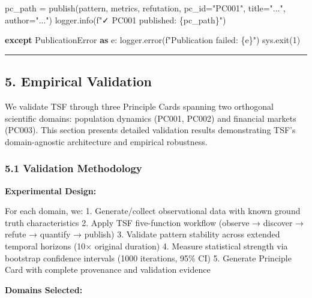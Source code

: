 \documentclass[
]{article}
\newenvironment{Shaded}{}{}
\newcommand{\ControlFlowTok}[1]{\textcolor[rgb]{0.00,0.44,0.13}{\textbf{#1}}}
\newcommand{\DecValTok}[1]{\textcolor[rgb]{0.25,0.63,0.44}{#1}}
\newcommand{\ImportTok}[1]{\textcolor[rgb]{0.00,0.50,0.00}{\textbf{#1}}}
\newcommand{\NormalTok}[1]{#1}
\newcommand{\OperatorTok}[1]{\textcolor[rgb]{0.40,0.40,0.40}{#1}}
\newcommand{\SpecialCharTok}[1]{\textcolor[rgb]{0.25,0.44,0.63}{#1}}
\newcommand{\SpecialStringTok}[1]{\textcolor[rgb]{0.73,0.40,0.53}{#1}}
\newcommand{\StringTok}[1]{\textcolor[rgb]{0.25,0.44,0.63}{#1}}
\begin{document}
\begin{Shaded}
\begin{Highlighting}[]
\NormalTok{    pc\_path }\OperatorTok{=}\NormalTok{ publish(pattern, metrics, refutation, pc\_id}\OperatorTok{=}\StringTok{"PC001"}\NormalTok{, title}\OperatorTok{=}\StringTok{"..."}\NormalTok{, author}\OperatorTok{=}\StringTok{"..."}\NormalTok{)}
\NormalTok{    logger.info(}\SpecialStringTok{f"✓ PC001 published: }\SpecialCharTok{\{}\NormalTok{pc\_path}\SpecialCharTok{\}}\SpecialStringTok{"}\NormalTok{)}

\ControlFlowTok{except}\NormalTok{ PublicationError }\ImportTok{as}\NormalTok{ e:}
\NormalTok{    logger.error(}\SpecialStringTok{f"Publication failed: }\SpecialCharTok{\{}\NormalTok{e}\SpecialCharTok{\}}\SpecialStringTok{"}\NormalTok{)}
\NormalTok{    sys.exit(}\DecValTok{1}\NormalTok{)}
\end{Highlighting}
\end{Shaded}

\begin{center}\rule{0.5\linewidth}{0.5pt}\end{center}

\subsection{5. Empirical Validation}\label{empirical-validation}

We validate TSF through three Principle Cards spanning two orthogonal
scientific domains: population dynamics (PC001, PC002) and financial
markets (PC003). This section presents detailed validation results
demonstrating TSF's domain-agnostic architecture and empirical
robustness.

\subsubsection{5.1 Validation Methodology}\label{validation-methodology}

\textbf{Experimental Design:}

For each domain, we: 1. Generate/collect observational data with known
ground truth characteristics 2. Apply TSF five-function workflow
(observe → discover → refute → quantify → publish) 3. Validate pattern
stability across extended temporal horizons (10× original duration) 4.
Measure statistical strength via bootstrap confidence intervals (1000
iterations, 95\% CI) 5. Generate Principle Card with complete provenance
and validation evidence

\textbf{Domains Selected:}
\end{document}
